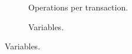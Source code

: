 \begin{figure}
 \begin{subfigure}{.33\textwidth}
  \caption{Operations per transaction.}
  \label{ser_operation_scale}
 \end{subfigure}
 \hspace{-3mm}
 \begin{subfigure}{.33\textwidth}
  \caption{Variables.}
  \label{ser_variable_scale}
 \end{subfigure}

\end{figure}
